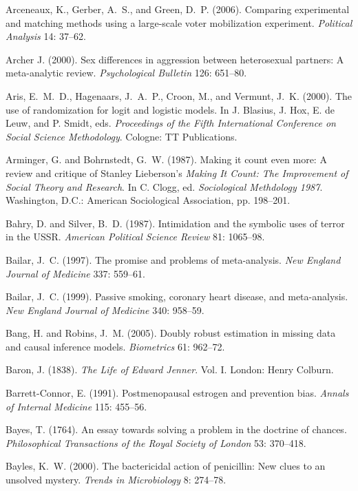 \smallskip\noindent
Arceneaux, K., Gerber, A.~S., and Green, D.~P. (2006).
Comparing experimental and matching methods using a large-scale voter mobilization experiment.
{\it Political Analysis\/} 14: 37--62.

\smallskip\noindent
Archer J. (2000).
Sex differences in aggression between heterosexual partners: A meta-analytic review.
{\it Psychological Bulletin\/} 126: 651--80.

\smallskip\noindent
Aris, E.~M.~D., Hagenaars, J.~A.~P., Croon, M., and Vermunt, J.~K. (2000).
The use of randomization for logit and logistic models.
In J. Blasius, J. Hox, E. de Leuw, and P. Smidt, eds.
{\it Proceedings of the Fifth International Conference on Social Science Methodology\/}.
Cologne: TT Publications.

\smallskip\noindent
Arminger, G. and Bohrnstedt, G.~W. (1987).
Making it count even more: A review and critique of Stanley Lieberson's
{\it Making It Count: The Improvement of Social Theory and Research\/}.
In C. Clogg, ed. {\it Sociological Methdology 1987\/}.
Washington, D.C.: American Sociological Association, pp. 198--201.

\smallskip\noindent
Bahry, D. and Silver, B.~D. (1987).
Intimidation and the symbolic uses of terror in the USSR.
{\it American Political Science Review\/} 81: 1065--98.

\smallskip\noindent
Bailar, J.~C. (1997).
The promise and problems of meta-analysis.
{\it New England Journal of Medicine\/} 337: 559--61.

\smallskip\noindent
Bailar, J.~C. (1999).
Passive smoking, coronary heart disease, and meta-analysis.
{\it New England Journal of Medicine\/} 340: 958--59.

\smallskip\noindent
Bang, H. and Robins, J.~M. (2005).
Doubly robust estimation in missing data and causal inference models.
{\it Biometrics\/} 61: 962--72.

\smallskip\noindent
Baron, J. (1838).
{\it The Life of Edward Jenner\/}. Vol. I.
London: Henry Colburn.

\smallskip\noindent
Barrett-Connor, E. (1991).
Postmenopausal estrogen and prevention bias.
{\it Annals of Internal Medicine\/} 115: 455--56.

\smallskip\noindent
Bayes, T. (1764).
An essay towards solving a problem in the doctrine of chances.
{\it Philosophical Transactions of the Royal Society of London\/} 53: 370--418.

\smallskip\noindent
Bayles, K.~W. (2000).
The bactericidal action of penicillin: New clues to an unsolved mystery.
{\it Trends in Microbiology\/} 8: 274--78.

